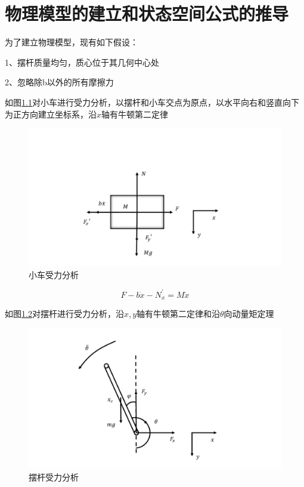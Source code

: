\chapter{物理模型的建立和状态空间公式的推导}

为了建立物理模型，现有如下假设：

1、摆杆质量均匀，质心位于其几何中心处

2、忽略除b以外的所有摩擦力


如图\ref{fig:car}对小车进行受力分析，以摆杆和小车交点为原点，以水平向右和竖直向下为正方向建立坐标系，沿$x$轴有牛顿第二定律

\begin{figure}[hbpt]
\centering
\includegraphics[width=12cm]{car.jpg}
\caption{小车受力分析}\label{fig:car}
\end{figure}


\begin{equation}
F-b\dot x-N_x^{'}=M\ddot x
\end{equation}

如图\ref{fig:stick}对摆杆进行受力分析，沿$x,y$轴有牛顿第二定律和沿$\theta$向动量矩定理

\begin{figure}[hbpt]
\centering
\includegraphics[width=12cm]{stick.jpg}
\caption{摆杆受力分析}\label{fig:stick}
\end{figure}

